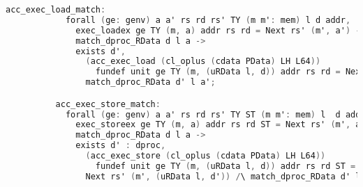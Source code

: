 
\begin{lstlisting}[language=C]
          acc_exec_load_match:
            forall (ge: genv) a a' rs rd rs' TY (m m': mem) l d addr,
              exec_loadex ge TY (m, a) addr rs rd = Next rs' (m', a') ->
              match_dproc_RData d l a ->
              exists d',
                (acc_exec_load (cl_oplus (cdata PData) LH L64)) 
                  fundef unit ge TY (m, (uRData l, d)) addr rs rd = Next rs' (m', (uRData l, d')) /\
                match_dproc_RData d' l a';

          acc_exec_store_match:
            forall (ge: genv) a a' rs rd rs' TY ST (m m': mem) l  d addr,           
              exec_storeex ge TY (m, a) addr rs rd ST = Next rs' (m', a') ->
              match_dproc_RData d l a ->
              exists d' : dproc,
                (acc_exec_store (cl_oplus (cdata PData) LH L64)) 
                  fundef unit ge TY (m, (uRData l, d)) addr rs rd ST =
                Next rs' (m', (uRData l, d')) /\ match_dproc_RData d' l a';
\end{lstlisting}

